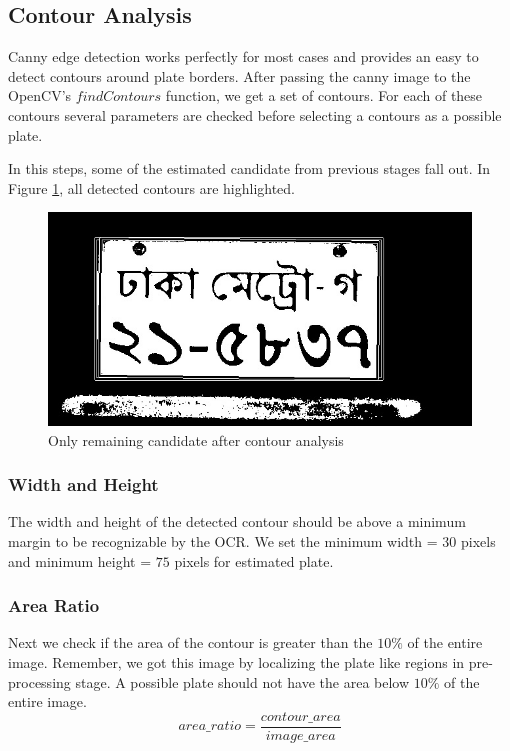 \documentclass{standalone}
\begin{document}
\subsection{Contour Analysis}
Canny edge detection works perfectly for most cases and provides an easy to detect contours around plate borders. After passing the canny image to the OpenCV's $findContours$ function, we get a set of contours. For each of these contours several parameters are checked before selecting a contours as a possible plate.

In this steps, some of the estimated candidate from previous stages fall out. In Figure \ref{fig:ContourImage}, all detected contours are highlighted.
\begin{figure}
    \centering
    \includegraphics[width=.7\linewidth]{./img/sample/stage9.jpg}
    \caption{Only remaining candidate after contour analysis}
    \label{fig:ContourImage}
\end{figure}



\subsubsection{Width and Height}
The width and height of the detected contour should be above a minimum margin to be recognizable by the OCR. We set the minimum width = $30$ pixels and minimum height = $75$ pixels for estimated plate.

\subsubsection{Area Ratio}
Next we check if the area of the contour is greater than the $10\%$ of the entire image. Remember, we got this image by localizing the plate like regions in pre-processing stage. A possible plate should not have the area below $10\%$ of the entire image.
\begin{equation}
area\_ratio = \dfrac{contour\_area}{image\_area }
\end{equation}
\end{document}
